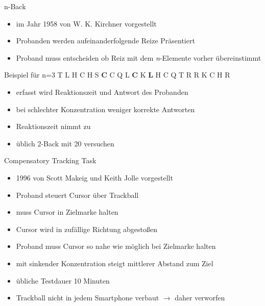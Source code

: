 \begin{frame}{n-Back}
	\begin{itemize}[<+->]
	\item im Jahr 1958 von W. K. Kirchner vorgestellt
	\item Probanden werden aufeinanderfolgende Reize Präsentiert
	\item Proband muss entscheiden ob Reiz mit dem \textit{n}-Elemente vorher übereinstimmt
	\end{itemize}
	\pause
	\begin{block}{Beispiel für n=3}
		T L H C H S \textbf{C} C Q L \textbf{C} K \textbf{L} H C Q T R R K C H R
	\end{block}
	\pause
	\begin{itemize}[<+->]
	\item erfasst wird Reaktionszeit und Antwort des Probanden
	\item bei schlechter Konzentration weniger korrekte Antworten 
	\item Reaktionszeit nimmt zu
	\item üblich 2-Back mit 20 versuchen
	\end{itemize}
\end{frame}
\begin{frame}{Compensatory Tracking Task}
	\begin{itemize}[<+->]
	\item 1996 von Scott Makeig und Keith Jolle vorgestellt
	\item Proband steuert Cursor über Trackball
	\item muss Cursor in Zielmarke halten
	\item Cursor wird in zufällige Richtung abgestoßen
	\item Proband muss Cursor so nahe wie möglich bei Zielmarke halten
	\item mit sinkender Konzentration steigt mittlerer Abstand zum Ziel
	\item übliche Testdauer 10 Minuten
	\item Trackball nicht in jedem Smartphone verbaut $\rightarrow$ daher verworfen
	\end{itemize}
\end{frame}